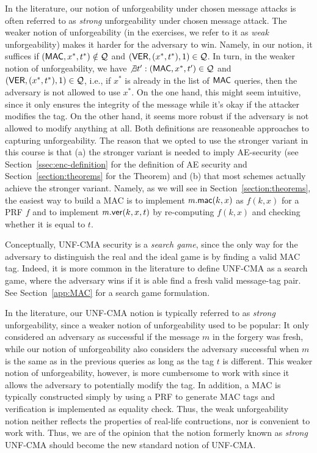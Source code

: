 \begin{remark} In the literature, our notion of unforgeability under chosen message attacks is often referred to
  as \emph{strong} unforgeability under chosen message attack. The weaker notion of unforgeability (in the exercises, we
  refer to it as \emph{weak} unforgeability) makes it harder for the adversary to win. Namely, in our notion, it suffices
  if $(\mathsf{MAC}, x^*,t^*)\notin \mathcal{Q}$ and $(\mathsf{VER}, (x^*,t^*),1)\in \mathcal{Q}$. In turn, in the weaker notion
  of unforgeability, we have $\not\exists t':(\mathsf{MAC}, x^*,t')\in \mathcal{Q}$ and $(\mathsf{VER}, (x^*,t^*),1)\in \mathcal{Q}$,
  i.e., if $x^*$ is already in the list of $\mathsf{MAC}$ queries, then the adversary is not allowed to use $x^*$. On the one
  hand, this might seem intuitive, since it only ensures the integrity of the message while it's okay if the attacker
  modifies the tag. On the other hand, it seems more robust if the adversary is not allowed to modify anything at all.
  Both definitions are reasoneable approaches to capturing unforgeability. The reason that we opted to use the
  stronger variant in this course is that (a) the stronger variant is needed to imply AE-security (see Section~\ref{ssec:enc-definition}
  for the definition of AE security and Section~\ref{section:theorems} for the Theorem) and (b) that most schemes actually
  achieve the stronger variant. Namely, as we will see in Section~\ref{section:theorems}, the easiest way to build a MAC
  is to implement $\mathit{{m}}.\mathsf{mac}(k,x)$ as $f(k,x)$ for a PRF $f$ and to implement $\mathit{{m}}.\mathsf{ver}(k,x,t)$ by re-computing $f(k,x)$ and
  checking whether it is equal to $t$.
\end{remark}

\begin{remark}
  Conceptually, UNF-CMA security is a \emph{search game}, since the only way for the adversary to distinguish the real and the ideal game is by finding a valid MAC tag. Indeed, it is more common in the literature to define UNF-CMA as a search game, where the adversary wins if it is able find a fresh valid message-tag pair. See Section~\ref{app:MAC} for a search game formulation.
\end{remark}

\begin{remark}
  In the literature, our UNF-CMA notion is typically referred to as \emph{strong} unforgeability, since a weaker notion of unforgeability used to be popular: It only considered an adversary as successful if the message $m$ in the forgery was fresh, while our notion of unforgeability also considers the adversary successful when $m$ is the same as in the previous queries as long as the tag $t$ is different. This weaker notion of unforgeability, however, is more cumbersome to work with since it allows the adversary to potentially modify the tag. In addition, a MAC is typically constructed simply by using a PRF to generate MAC tags and verification is implemented as equality check. Thus, the weak unforgeability notion neither reflects the properties of real-life contructions, nor is convenient to work with. Thus, we are of the opinion that the notion formerly known as \emph{strong} UNF-CMA should become the new standard notion of UNF-CMA.
\end{remark}
